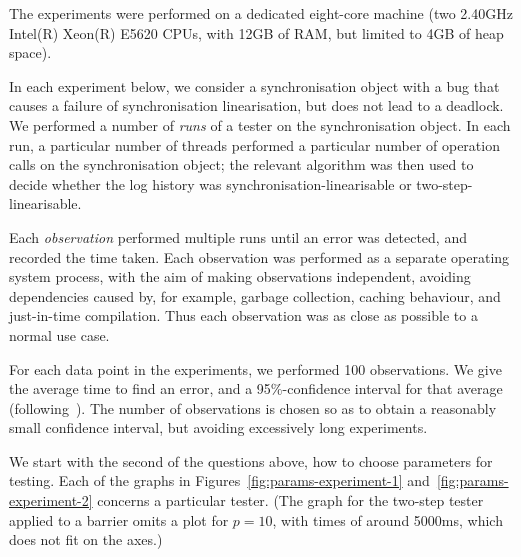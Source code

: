 
The experiments were performed on a dedicated eight-core machine (two 2.40GHz
Intel(R) Xeon(R) E5620 CPUs, with 12GB of RAM, but limited to 4GB of heap
space).

In each experiment below, we consider a synchronisation object with a bug that
causes a failure of synchronisation linearisation, but does not lead to a
deadlock.  We performed a number of \emph{runs} of a tester on the
synchronisation object.  In each run, a particular number of threads performed
a particular number of operation calls on the synchronisation object; the
relevant algorithm was then used to decide whether the log history was
synchronisation-linearisable or two-step-linearisable.

Each \emph{observation} performed multiple runs until an error was detected,
and recorded the time taken.  Each observation was performed as a separate
operating system process, with the aim of making observations independent,
avoiding dependencies caused by, for example, garbage collection, caching
behaviour, and just-in-time compilation.  Thus each observation was as close
as possible to a normal use case.

For each data point in the experiments, we performed 100 observations.  We
give the average time to find an error, and a 95\%-confidence interval for
that average (following~\cite{GBE2007}).  The number of observations is chosen
so as to obtain a reasonably small confidence interval, but avoiding
excessively long experiments.


%

%

We start with the second of the questions above, how to choose parameters for
testing.  Each of the graphs in Figures~\ref{fig:params-experiment-1}
and~\ref{fig:params-experiment-2} concerns a particular tester.  
(The graph for the two-step
tester applied to a barrier omits a plot for $p = 10$, with times of around
5000ms, which does not fit on the axes.)

